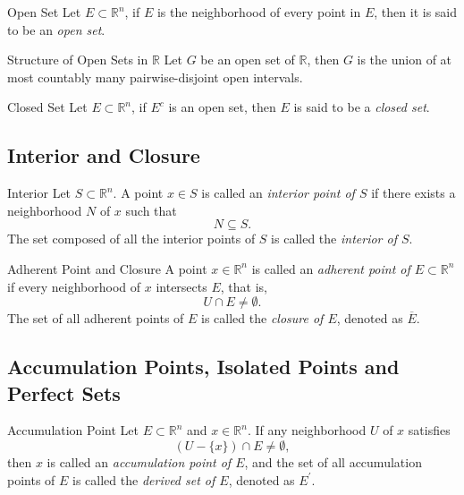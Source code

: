\begin{definition}{Open Set}{}
  Let $E \subset \mathbb{R}^n$, if $E$ is the neighborhood of every point in
  $E$,
  then it is said to be an \emph{open set}.
\end{definition}

\begin{theorem}{Structure of Open Sets in $\mathbb{R}$}{}
  Let $G$ be an open set of $\mathbb{R}$,
  then $G$ is the union of at most countably many pairwise-disjoint open intervals.
\end{theorem}

\begin{definition}{Closed Set}{}
  Let $E \subset \mathbb{R}^n$, if $E^c$ is an open set,
  then $E$ is said to be a \emph{closed set}.
\end{definition}

\subsection{Interior and Closure}

\begin{definition}{Interior}{}
  Let $S \subset \mathbb{R}^n$.
  A point $x \in S$ is called an \emph{interior point of $S$} if there exists a
  neighborhood $N$ of $x$ such that
  \begin{equation}
    N \subseteq S.
  \end{equation}
  The set composed of all the interior points of $S$ is called the \emph{interior of $S$}.
\end{definition}

\begin{definition}{Adherent Point and Closure}{}
  A point $x \in \mathbb{R}^n$ is called an \emph{adherent point of $E \subset \mathbb{R}^n$} if
  every neighborhood of $x$ intersects $E$, that is,
  \begin{equation}
    U \cap E \neq \emptyset.
  \end{equation}
  The set of all adherent points of $E$ is called the \emph{closure of $E$}, denoted as $\overline{E}$.
\end{definition}



\subsection{Accumulation Points, Isolated Points and Perfect Sets}

\begin{definition}{Accumulation Point}{}
  Let $E \subset \mathbb{R}^n$ and $x \in \mathbb{R}^n$.
  If any neighborhood $U$ of $x$ satisfies
  \begin{equation}
    (U - \{x\}) \cap E \neq \emptyset,
  \end{equation}
  then $x$ is called an \emph{accumulation point of $E$},
  and the set of all accumulation points of $E$ is called the \emph{derived set
    of $E$}, denoted as $E^{\prime}$.
\end{definition}

